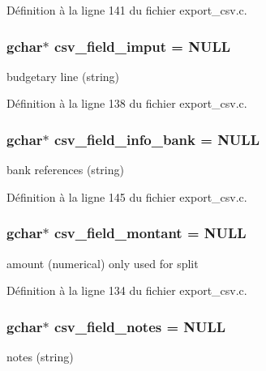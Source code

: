 Définition à la ligne 141 du fichier export\_\-csv.c.

\subsubsection[{csv\_\-field\_\-imput}]{\setlength{\rightskip}{0pt plus 5cm}gchar$\ast$ {\bf csv\_\-field\_\-imput} = NULL}\label{export__csv_8c_a9ee66434e628d8be9701619ce5206417}
budgetary line (string) 

Définition à la ligne 138 du fichier export\_\-csv.c.

\subsubsection[{csv\_\-field\_\-info\_\-bank}]{\setlength{\rightskip}{0pt plus 5cm}gchar$\ast$ {\bf csv\_\-field\_\-info\_\-bank} = NULL}\label{export__csv_8c_abf2c737aba219390d52cff9344f7973c}
bank references (string) 

Définition à la ligne 145 du fichier export\_\-csv.c.

\subsubsection[{csv\_\-field\_\-montant}]{\setlength{\rightskip}{0pt plus 5cm}gchar$\ast$ {\bf csv\_\-field\_\-montant} = NULL}\label{export__csv_8c_a31dc379c2596a4318cf39e65f2e7080e}
amount (numerical) only used for split 

Définition à la ligne 134 du fichier export\_\-csv.c.

\subsubsection[{csv\_\-field\_\-notes}]{\setlength{\rightskip}{0pt plus 5cm}gchar$\ast$ {\bf csv\_\-field\_\-notes} = NULL}\label{export__csv_8c_ae4abdc9e3bca980c1157ccee7c8b3649}
notes (string) 

